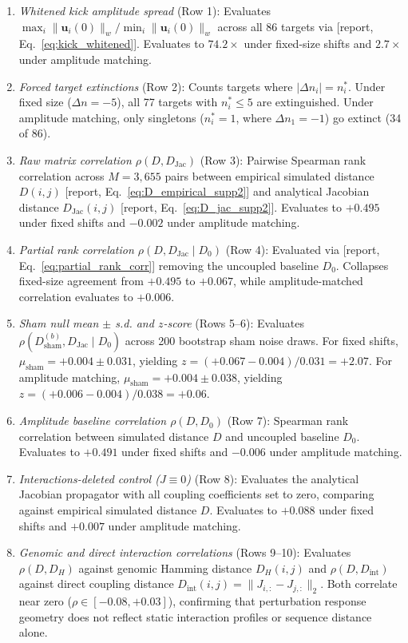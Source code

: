 \documentclass[11pt,a4paper]{article}
\newcommand{\R}[1]{\textcolor{blue!55!black}{[report, #1]}}
\begin{document}
\begin{enumerate}
\item \textit{Whitened kick amplitude spread} (Row 1): Evaluates $\max_i \|\mathbf{u}_i(0)\|_w / \min_i \|\mathbf{u}_i(0)\|_w$ across all $86$ targets via \R{Eq.~\ref{eq:kick_whitened}}. Evaluates to $74.2\times$ under fixed-size shifts and $2.7\times$ under amplitude matching.
\item \textit{Forced target extinctions} (Row 2): Counts targets where $|\Delta n_i| = n_i^*$. Under fixed size ($\Delta n = -5$), all 77 targets with $n_i^* \le 5$ are extinguished. Under amplitude matching, only singletons ($n_i^* = 1$, where $\Delta n_1 = -1$) go extinct (34 of 86).
\item \textit{Raw matrix correlation $\rho(D, D_{\mathrm{Jac}})$} (Row 3): Pairwise Spearman rank correlation across $M = 3{,}655$ pairs between empirical simulated distance $D(i,j)$ \R{Eq.~\ref{eq:D_empirical_supp2}} and analytical Jacobian distance $D_{\mathrm{Jac}}(i,j)$ \R{Eq.~\ref{eq:D_jac_supp2}}. Evaluates to $+0.495$ under fixed shifts and $-0.002$ under amplitude matching.
\item \textit{Partial rank correlation $\rho(D, D_{\mathrm{Jac}} \mid D_0)$} (Row 4): Evaluated via \R{Eq.~\ref{eq:partial_rank_corr}} removing the uncoupled baseline $D_0$. Collapses fixed-size agreement from $+0.495$ to $+0.067$, while amplitude-matched correlation evaluates to $+0.006$.
\item \textit{Sham null mean $\pm$ s.d. and $z$-score} (Rows 5--6): Evaluates $\rho(D_{\mathrm{sham}}^{(b)}, D_{\mathrm{Jac}} \mid D_0)$ across 200 bootstrap sham noise draws. For fixed shifts, $\mu_{\mathrm{sham}} = +0.004 \pm 0.031$, yielding $z = (+0.067 - 0.004) / 0.031 = +2.07$. For amplitude matching, $\mu_{\mathrm{sham}} = +0.004 \pm 0.038$, yielding $z = (+0.006 - 0.004) / 0.038 = +0.06$.
\item \textit{Amplitude baseline correlation $\rho(D, D_0)$} (Row 7): Spearman rank correlation between simulated distance $D$ and uncoupled baseline $D_0$. Evaluates to $+0.491$ under fixed shifts and $-0.006$ under amplitude matching.
\item \textit{Interactions-deleted control ($J \equiv 0$)} (Row 8): Evaluates the analytical Jacobian propagator with all coupling coefficients set to zero, comparing against empirical simulated distance $D$. Evaluates to $+0.088$ under fixed shifts and $+0.007$ under amplitude matching.
\item \textit{Genomic and direct interaction correlations} (Rows 9--10): Evaluates $\rho(D, D_H)$ against genomic Hamming distance $D_H(i,j)$ and $\rho(D, D_{\mathrm{int}})$ against direct coupling distance $D_{\mathrm{int}}(i,j) = \|J_{i,:} - J_{j,:}\|_2$. Both correlate near zero ($\rho \in [-0.08, +0.03]$), confirming that perturbation response geometry does not reflect static interaction profiles or sequence distance alone.

\end{enumerate}
\end{document}
